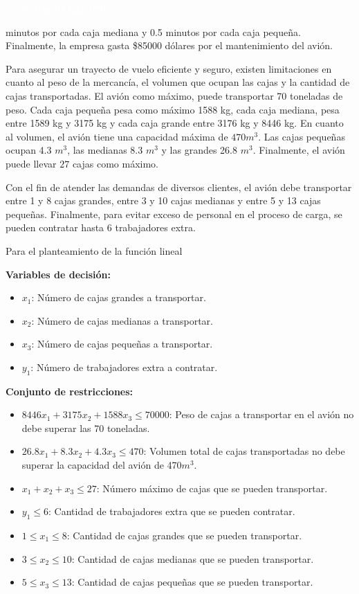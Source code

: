 \documentclass[11pt]{article}
\begin{document}
\newpage
\begin{itemize}
    \item[\textcolor{white}{ESPACIO}] \textcolor{white}{ESPACIO}
\end{itemize}

minutos por cada caja mediana y 0.5 minutos por cada caja pequeña. Finalmente, la empresa gasta \$85000 dólares por el mantenimiento del avión.

Para asegurar un trayecto de vuelo eficiente y seguro, existen limitaciones en cuanto al peso de la mercancía, el volumen que ocupan las cajas y la cantidad de cajas transportadas. El avión como máximo, puede transportar 70 toneladas de peso. Cada caja pequeña pesa como máximo 1588 kg, cada caja mediana, pesa entre 1589 kg y 3175 kg y cada caja grande entre 3176 kg y 8446 kg. En cuanto al volumen, el avión tiene una capacidad máxima de $470 m^3$. Las cajas pequeñas ocupan 4.3 $m^3$, las medianas 8.3 $m^3$ y las grandes 26.8 $m^3$. Finalmente, el avión puede llevar $27$ cajas como máximo. 

Con el fin de atender las demandas de diversos clientes, el avión debe transportar entre 1 y 8 cajas grandes, entre 3 y 10 cajas medianas y entre 5 y 13 cajas pequeñas. Finalmente, para evitar exceso de personal en el proceso de carga, se pueden contratar hasta 6 trabajadores extra. 

Para el planteamiento de la función lineal 


\textbf{Variables de decisión:}

\begin{itemize}
 \item $x_1$: Número de cajas grandes a transportar.
 \item $x_2$: Número de cajas medianas a transportar.
 \item $x_3$: Número de cajas pequeñas a transportar.
 \item $y_1$: Número de trabajadores extra a contratar.
\end{itemize}

\textbf{Conjunto de restricciones:}
\begin{itemize}
 \item $8446x_1+3175x_2+1588x_3\leq 70000$: Peso de cajas a transportar en el avión no debe superar las 70 toneladas.
 \item $26.8x_1 + 8.3x_2 + 4.3x_3 \leq 470$: Volumen total de cajas transportadas no debe superar la capacidad del avión de 470$m^3$.
 \item $x_1 + x_2 + x_3 \leq 27$: Número máximo de cajas que se pueden transportar.
 \item $y_1 \leq 6$: Cantidad de trabajadores extra que se pueden contratar.
 \item $1 \leq x_1 \leq 8$: Cantidad de cajas grandes que se pueden transportar.
 \item $3 \leq x_2 \leq 10$: Cantidad de cajas medianas que se pueden transportar.
 \item $5 \leq x_3 \leq 13$: Cantidad de cajas pequeñas que se pueden transportar.
\end{itemize}
\end{document}
